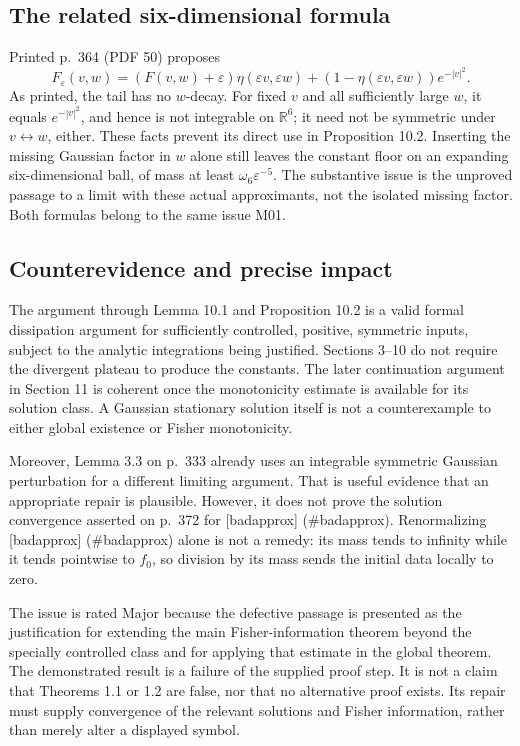 \documentclass[10pt]{article}
\begin{document}
\subsection*{The related six-dimensional formula}
Printed p. 364 (PDF 50) proposes \[F_\varepsilon(v,w)=(F(v,w)+\varepsilon)\eta(\varepsilon v,\varepsilon w)
 +(1-\eta(\varepsilon v,\varepsilon w))e^{-|v|^2}.\] As printed, the tail has no \(w\)-decay. For fixed \(v\) and all sufficiently large \(w\), it equals \(e^{-|v|^2}\), and hence is not integrable on \(\mathbb R^6\); it need not be symmetric under \(v\leftrightarrow w\), either. These facts prevent its direct use in Proposition 10.2. Inserting the missing Gaussian factor in \(w\) alone still leaves the constant floor on an expanding six-dimensional ball, of mass at least \(\omega_6\varepsilon^{-5}\). The substantive issue is the unproved passage to a limit with these actual approximants, not the isolated missing factor. Both formulas belong to the same issue M01.\par
\subsection*{Counterevidence and precise impact}
The argument through Lemma 10.1 and Proposition 10.2 is a valid formal dissipation argument for sufficiently controlled, positive, symmetric inputs, subject to the analytic integrations being justified. Sections 3–10 do not require the divergent plateau to produce the constants. The later continuation argument in Section 11 is coherent once the monotonicity estimate is available for its solution class. A Gaussian stationary solution itself is not a counterexample to either global existence or Fisher monotonicity.\par
Moreover, Lemma 3.3 on p. 333 already uses an integrable symmetric Gaussian perturbation for a different limiting argument. That is useful evidence that an appropriate repair is plausible. However, it does not prove the solution convergence asserted on p. 372 for [badapprox] (\#badapprox). Renormalizing [badapprox] (\#badapprox) alone is not a remedy: its mass tends to infinity while it tends pointwise to \(f_0\), so division by its mass sends the initial data locally to zero.\par
The issue is rated Major because the defective passage is presented as the justification for extending the main Fisher-information theorem beyond the specially controlled class and for applying that estimate in the global theorem. The demonstrated result is a failure of the supplied proof step. It is not a claim that Theorems 1.1 or 1.2 are false, nor that no alternative proof exists. Its repair must supply convergence of the relevant solutions and Fisher information, rather than merely alter a displayed symbol.\par
\end{document}
